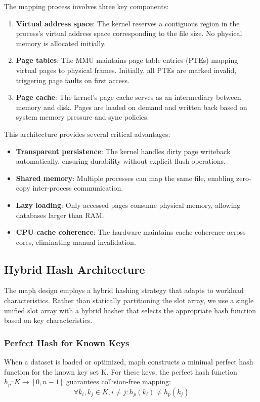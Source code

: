 \documentclass[10pt,conference]{IEEEtran}
\begin{document}
The mapping process involves three key components:

\begin{enumerate}
\item \textbf{Virtual address space}: The kernel reserves a contiguous region in the process's virtual address space corresponding to the file size. No physical memory is allocated initially.

\item \textbf{Page tables}: The MMU maintains page table entries (PTEs) mapping virtual pages to physical frames. Initially, all PTEs are marked invalid, triggering page faults on first access.

\item \textbf{Page cache}: The kernel's page cache serves as an intermediary between memory and disk. Pages are loaded on demand and written back based on system memory pressure and sync policies.
\end{enumerate}

This architecture provides several critical advantages:

\begin{itemize}
\item \textbf{Transparent persistence}: The kernel handles dirty page writeback automatically, ensuring durability without explicit flush operations.
\item \textbf{Shared memory}: Multiple processes can map the same file, enabling zero-copy inter-process communication.
\item \textbf{Lazy loading}: Only accessed pages consume physical memory, allowing databases larger than RAM.
\item \textbf{CPU cache coherence}: The hardware maintains cache coherence across cores, eliminating manual invalidation.
\end{itemize}

\subsection{Hybrid Hash Architecture}

The maph design employs a hybrid hashing strategy that adapts to workload characteristics. Rather than statically partitioning the slot array, we use a single unified slot array with a hybrid hasher that selects the appropriate hash function based on key characteristics.

\subsubsection{Perfect Hash for Known Keys}
When a dataset is loaded or optimized, maph constructs a minimal perfect hash function for the known key set K. For these keys, the perfect hash function $h_p: K \to [0, n-1]$ guarantees collision-free mapping:
\begin{equation}
\forall k_i, k_j \in K, i \neq j : h_p(k_i) \neq h_p(k_j)
\end{equation}
\end{document}
